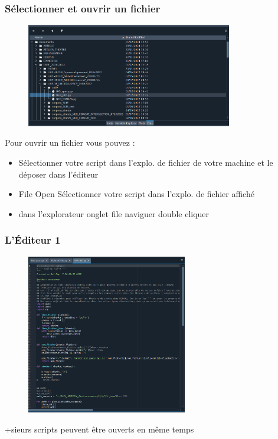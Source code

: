 \begin{frame}
  \frametitle{Sélectionner et ouvrir un fichier}
  \begin{figure}
  \includegraphics[width=9cm]{images/spyder_Files.png}
  \end{figure}
  \vspace{-0.3cm}
  Pour ouvrir un fichier vous pouvez :
  \begin{itemize}
  \item {} Sélectionner votre script dans l'explo. de fichier de votre machine et le déposer dans l'éditeur
  \item {} File  Open  Sélectionner votre script dans l'explo. de fichier affiché 
  \item {} dans l'explorateur onglet  file  naviguer  double cliquer
  \end{itemize}
  \end{frame}

\begin{frame} \frametitle{L'Éditeur 1}
  \begin{figure}
  \includegraphics[width=7cm]{images/spyder_editor.png}
  \end{figure}
  
   +sieurs scripts peuvent être ouverts en même temps
\end{frame}

